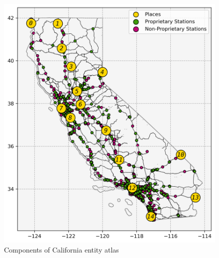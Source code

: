 \begin{figure}[H]
	\centering
	\includegraphics[width = \linewidth]{figs/California_Places_Chargers.png}
	\caption{Components of California entity atlas}
	\label{fig:california_entity_atlas}
\end{figure}